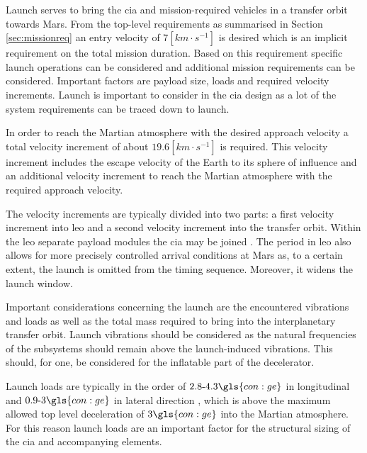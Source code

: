 Launch serves to bring the \gls{cia} and mission-required vehicles in a transfer orbit towards Mars. From the top-level requirements as summarised in Section \ref{sec:missionreq} an entry velocity of $7 \left[km\cdot s^{-1}\right]$ is desired which is an implicit requirement on the total mission duration.
Based on this requirement specific launch operations can be considered and additional mission requirements can be considered. Important factors are payload size, loads and required velocity increments. Launch is important to consider in the \gls{cia} design as a lot of the system requirements can be traced down to launch.

In order to reach the Martian atmosphere with the desired approach velocity a total velocity increment of about $19.6 \left[km\cdot s^{-1}\right]$ is required. This velocity increment includes the escape velocity of the Earth to its sphere of influence and an additional velocity increment to reach the Martian atmosphere with the required approach velocity.

The velocity increments are typically divided into two parts: a first velocity increment into \gls{leo} and a second velocity increment into the transfer orbit. Within the \gls{leo} separate payload modules the \gls{cia} may be joined \cite{George2009}. The period in \gls{leo} also allows for more precisely controlled arrival conditions at Mars as, to a certain extent, the launch is omitted from the timing sequence. Moreover, it widens the launch window.


Important considerations concerning the launch are the encountered vibrations and loads as well as the total mass required to bring into the interplanetary transfer orbit. Launch vibrations should be considered as the natural frequencies of the subsystems should remain above the launch-induced vibrations. This should, for one, be considered for the inflatable part of the decelerator.

Launch loads are typically in the order of $2.8\mbox{-}4.3 \gls{con:ge}$ in longitudinal and $0.9\mbox{-}3 \gls{con:ge}$ in lateral direction \cite{Wertz2011}, which is above the maximum allowed top level deceleration of $3\gls{con:ge}$ into the Martian atmosphere. For this reason launch loads are an important factor for the structural sizing of the \gls{cia} and accompanying elements. 

